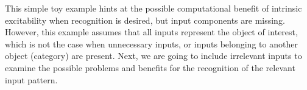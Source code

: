This simple toy example hints at the possible computational benefit of intrinsic excitability
        when recognition is desired, but input components are missing.
    However, this example assumes that all inputs represent the object of interest,
        which is not the case when unnecessary inputs,
        or inputs belonging to another object (category) are present.
    Next, we are going to include irrelevant inputs to examine the possible problems and benefits
        for the recognition of the relevant input pattern.